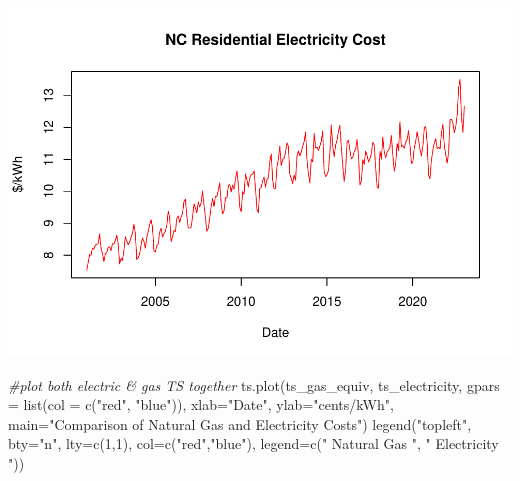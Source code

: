 \documentclass[
]{article}
\newenvironment{Shaded}{\begin{snugshade}}{\end{snugshade}}
\newcommand{\AttributeTok}[1]{\textcolor[rgb]{0.77,0.63,0.00}{#1}}
\newcommand{\CommentTok}[1]{\textcolor[rgb]{0.56,0.35,0.01}{\textit{#1}}}
\newcommand{\DecValTok}[1]{\textcolor[rgb]{0.00,0.00,0.81}{#1}}
\newcommand{\FunctionTok}[1]{\textcolor[rgb]{0.00,0.00,0.00}{#1}}
\newcommand{\NormalTok}[1]{#1}
\newcommand{\OtherTok}[1]{\textcolor[rgb]{0.56,0.35,0.01}{#1}}
\newcommand{\StringTok}[1]{\textcolor[rgb]{0.31,0.60,0.02}{#1}}
\begin{document}
\begin{Shaded}
\end{Shaded}

\includegraphics{Final-Project_files/figure-latex/unnamed-chunk-3-2.pdf}

\begin{Shaded}
\begin{Highlighting}[]
\CommentTok{\#plot both electric \& gas TS together}
\FunctionTok{ts.plot}\NormalTok{(ts\_gas\_equiv, ts\_electricity, }\AttributeTok{gpars =} \FunctionTok{list}\NormalTok{(}\AttributeTok{col =} \FunctionTok{c}\NormalTok{(}\StringTok{"red"}\NormalTok{, }\StringTok{"blue"}\NormalTok{)), }
        \AttributeTok{xlab=}\StringTok{"Date"}\NormalTok{, }\AttributeTok{ylab=}\StringTok{"cents/kWh"}\NormalTok{, }
        \AttributeTok{main=}\StringTok{"Comparison of Natural Gas and Electricity Costs"}\NormalTok{)}
\FunctionTok{legend}\NormalTok{(}\StringTok{"topleft"}\NormalTok{, }\AttributeTok{bty=}\StringTok{"n"}\NormalTok{, }\AttributeTok{lty=}\FunctionTok{c}\NormalTok{(}\DecValTok{1}\NormalTok{,}\DecValTok{1}\NormalTok{), }\AttributeTok{col=}\FunctionTok{c}\NormalTok{(}\StringTok{"red"}\NormalTok{,}\StringTok{"blue"}\NormalTok{),}
       \AttributeTok{legend=}\FunctionTok{c}\NormalTok{(}\StringTok{" Natural Gas "}\NormalTok{, }\StringTok{" Electricity "}\NormalTok{))}
\end{Highlighting}
\end{Shaded}
\end{document}
